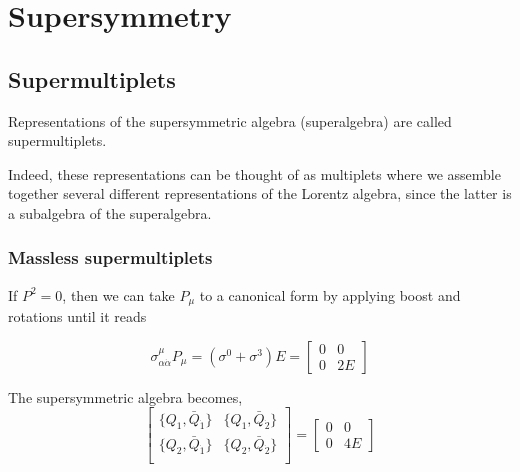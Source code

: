 \chapter{Supersymmetry}
\adjustmtc
\minitoc
\section{Supermultiplets}

\begin{definition}[Supermultiplet]
  Representations of the supersymmetric algebra (superalgebra) are called
  supermultiplets.
\end{definition}

Indeed, these representations can be thought of as multiplets where we assemble
together several different representations of the Lorentz algebra, since the
latter is a subalgebra of the superalgebra.

\subsection{Massless supermultiplets}
If $P^2=0$, then we can take $P_\mu$ to a canonical form by applying boost and
rotations until it reads

\begin{equation}
  \sigma^{\mu}_{\alpha\dot{\alpha}}P_\mu = \left(\sigma^0+\sigma^3\right)E = 
  \begin{bmatrix}
    0 & 0\\
    0 & 2E
  \end{bmatrix}
\end{equation}

The supersymmetric algebra becomes,
\begin{equation}
  \begin{bmatrix}
    \{Q_1,\bar{Q}_{\dot{1}}\} & \{Q_1,\bar{Q}_{\dot{2}}\} \\

    \{Q_2,\bar{Q}_{\dot{1}}\} & \{Q_2,\bar{Q}_{\dot{2}}\} \\

  \end{bmatrix}
  =
  \begin{bmatrix}
    0 & 0\\
    0 & 4E
  \end{bmatrix}
\end{equation}

